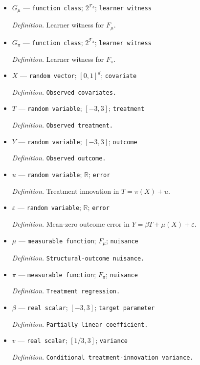 \documentclass{article}
\begin{document}
\begin{itemize}
  \item \(G_\mu\) --- \texttt{function class}; \(2^{\mathcal T_3}\); \texttt{learner witness}
  \par\smallskip\noindent\emph{Definition.} Learner witness for \(F_\mu\).
  \item \(G_\pi\) --- \texttt{function class}; \(2^{\mathcal T_3}\); \texttt{learner witness}
  \par\smallskip\noindent\emph{Definition.} Learner witness for \(F_\pi\).
  \item \(X\) --- \texttt{random vector}; \([0,1]^d\); \texttt{covariate}
  \par\smallskip\noindent\emph{Definition.} \texttt{Observed covariates.}
  \item \(T\) --- \texttt{random variable}; \([-3,3]\); \texttt{treatment}
  \par\smallskip\noindent\emph{Definition.} \texttt{Observed treatment.}
  \item \(Y\) --- \texttt{random variable}; \([-3,3]\); \texttt{outcome}
  \par\smallskip\noindent\emph{Definition.} \texttt{Observed outcome.}
  \item \(u\) --- \texttt{random variable}; \(\mathbb R\); \texttt{error}
  \par\smallskip\noindent\emph{Definition.} Treatment innovation in \(T=\pi(X)+u\).
  \item \(\varepsilon\) --- \texttt{random variable}; \(\mathbb R\); \texttt{error}
  \par\smallskip\noindent\emph{Definition.} Mean-zero outcome error in \(Y=\beta T+\mu(X)+\varepsilon\).
  \item \(\mu\) --- \texttt{measurable function}; \(F_\mu\); \texttt{nuisance}
  \par\smallskip\noindent\emph{Definition.} \texttt{Structural-\allowbreak{}outcome nuisance.}
  \item \(\pi\) --- \texttt{measurable function}; \(F_\pi\); \texttt{nuisance}
  \par\smallskip\noindent\emph{Definition.} \texttt{Treatment regression.}
  \item \(\beta\) --- \texttt{real scalar}; \([-3,3]\); \texttt{target parameter}
  \par\smallskip\noindent\emph{Definition.} \texttt{Partially linear coefficient.}
  \item \(v\) --- \texttt{real scalar}; \([1/3,3]\); \texttt{variance}
  \par\smallskip\noindent\emph{Definition.} \texttt{Conditional treatment-\allowbreak{}innovation variance.}

\end{itemize}
\end{document}
